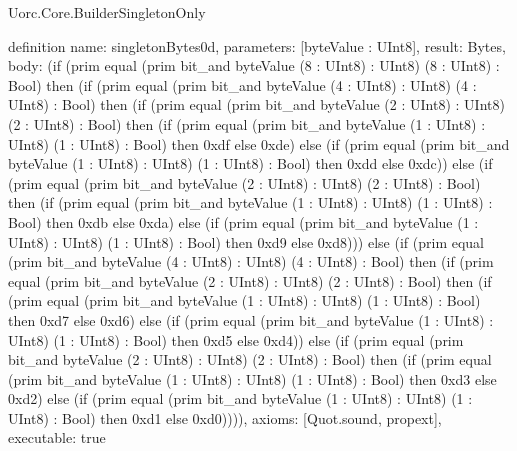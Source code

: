 \begin{lexlean}{Uorc.Core.BuilderSingletonOnly}
\begin{semanticmodule}
definition{
  name: singletonBytes0d,
  parameters: [byteValue : UInt8],
  result: Bytes,
  body: (if (prim equal (prim bit_and byteValue (8 : UInt8) : UInt8) (8 : UInt8) : Bool) then (if (prim equal (prim bit_and byteValue (4 : UInt8) : UInt8) (4 : UInt8) : Bool) then (if (prim equal (prim bit_and byteValue (2 : UInt8) : UInt8) (2 : UInt8) : Bool) then (if (prim equal (prim bit_and byteValue (1 : UInt8) : UInt8) (1 : UInt8) : Bool) then 0xdf else 0xde) else (if (prim equal (prim bit_and byteValue (1 : UInt8) : UInt8) (1 : UInt8) : Bool) then 0xdd else 0xdc)) else (if (prim equal (prim bit_and byteValue (2 : UInt8) : UInt8) (2 : UInt8) : Bool) then (if (prim equal (prim bit_and byteValue (1 : UInt8) : UInt8) (1 : UInt8) : Bool) then 0xdb else 0xda) else (if (prim equal (prim bit_and byteValue (1 : UInt8) : UInt8) (1 : UInt8) : Bool) then 0xd9 else 0xd8))) else (if (prim equal (prim bit_and byteValue (4 : UInt8) : UInt8) (4 : UInt8) : Bool) then (if (prim equal (prim bit_and byteValue (2 : UInt8) : UInt8) (2 : UInt8) : Bool) then (if (prim equal (prim bit_and byteValue (1 : UInt8) : UInt8) (1 : UInt8) : Bool) then 0xd7 else 0xd6) else (if (prim equal (prim bit_and byteValue (1 : UInt8) : UInt8) (1 : UInt8) : Bool) then 0xd5 else 0xd4)) else (if (prim equal (prim bit_and byteValue (2 : UInt8) : UInt8) (2 : UInt8) : Bool) then (if (prim equal (prim bit_and byteValue (1 : UInt8) : UInt8) (1 : UInt8) : Bool) then 0xd3 else 0xd2) else (if (prim equal (prim bit_and byteValue (1 : UInt8) : UInt8) (1 : UInt8) : Bool) then 0xd1 else 0xd0)))),
  axioms: [Quot.sound, propext],
  executable: true
}


\end{semanticmodule}
\end{lexlean}
